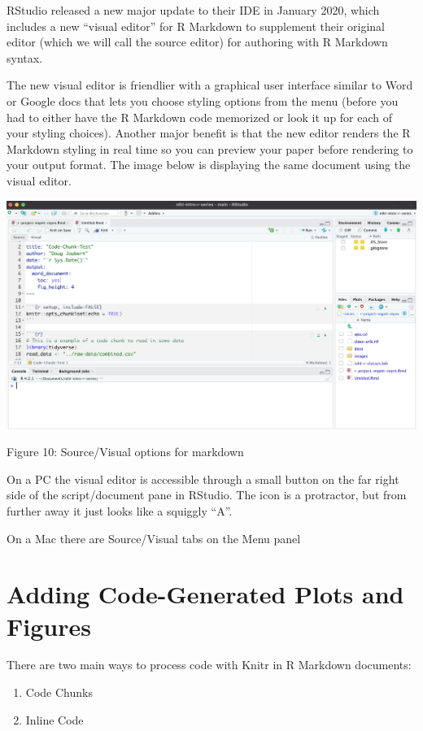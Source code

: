 \documentclass[
]{article}
\begin{document}
RStudio released a new major update to their IDE in January 2020, which
includes a new ``visual editor'' for R Markdown to supplement their
original editor (which we will call the source editor) for authoring
with R Markdown syntax.

The new visual editor is friendlier with a graphical user interface
similar to Word or Google docs that lets you choose styling options from
the menu (before you had to either have the R Markdown code memorized or
look it up for each of your styling choices). Another major benefit is
that the new editor renders the R Markdown styling in real time so you
can preview your paper before rendering to your output format. The image
below is displaying the same document using the visual editor.

\includegraphics[width=6.5in,height=\textheight]{images/02-rmd-new-template.png}

Figure 10: Source/Visual options for markdown

On a PC the visual editor is accessible through a small button on the
far right side of the script/document pane in RStudio. The icon is a
protractor, but from further away it just looks like a squiggly ``A''.

On a Mac there are Source/Visual tabs on the Menu panel

\hypertarget{adding-code-generated-plots-and-figures}{%
\section{Adding Code-Generated Plots and
Figures}\label{adding-code-generated-plots-and-figures}}

There are two main ways to process code with Knitr in R Markdown
documents:

\begin{enumerate}
\def\labelenumi{\arabic{enumi}.}
\item
  Code Chunks
\item
  Inline Code
\end{enumerate}
\end{document}
